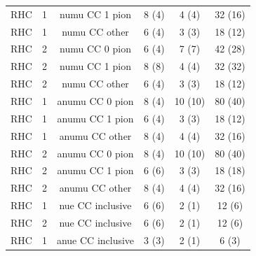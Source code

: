 \begin{table}
\begin{adjustbox}{center}
\begin{tabular}{cccccc}
      \Gls{RHC}                     & 1                          & \Gls{numu} \Gls{CC} 1 pion    &  8 (4)    &  4  (4)       &  32 (16)         \\ 
      \Gls{RHC}                     & 1                          & \Gls{numu} \Gls{CC} other     &  6 (4)    &  3  (3)       &  18 (12)         \\ 
      \Gls{RHC}                     & 2                          & \Gls{numu} \Gls{CC} 0 pion    &  6 (4)    &  7  (7)       &  42 (28)         \\ 
      \Gls{RHC}                     & 2                          & \Gls{numu} \Gls{CC} 1 pion    &  8 (8)    &  4  (4)       &  32 (32)         \\ 
      \Gls{RHC}                     & 2                          & \Gls{numu} \Gls{CC} other     &  6 (4)    &  3  (3)       &  18 (12)         \\ 
      \Gls{RHC}                     & 1                          & \Gls{anumu} \Gls{CC} 0 pion   &  8 (4)    & 10 (10)       &  80 (40)         \\ 
      \Gls{RHC}                     & 1                          & \Gls{anumu} \Gls{CC} 1 pion   &  6 (4)    &  3  (3)       &  18 (12)         \\ 
      \Gls{RHC}                     & 1                          & \Gls{anumu} \Gls{CC} other    &  8 (4)    &  4  (4)       &  32 (16)         \\ 
      \Gls{RHC}                     & 2                          & \Gls{anumu} \Gls{CC} 0 pion   &  8 (4)    & 10 (10)       &  80 (40)         \\ 
      \Gls{RHC}                     & 2                          & \Gls{anumu} \Gls{CC} 1 pion   &  6 (6)    &  3  (3)       &  18 (18)         \\ 
      \Gls{RHC}                     & 2                          & \Gls{anumu} \Gls{CC} other    &  8 (4)    &  4  (4)       &  32 (16)         \\ 
      \Gls{RHC}                     & 1                          & \Gls{nue}  \Gls{CC} inclusive &  6 (6)    &  2  (1)       &  12  (6)         \\ 
      \Gls{RHC}                     & 2                          & \Gls{nue}  \Gls{CC} inclusive &  6 (6)    &  2  (1)       &  12  (6)         \\ 
      \Gls{RHC}                     & 1                          & \Gls{anue} \Gls{CC} inclusive &  3 (3)    &  2  (1)       &   6  (3)         \\ 

\end{tabular}
\end{adjustbox}
\end{table}
